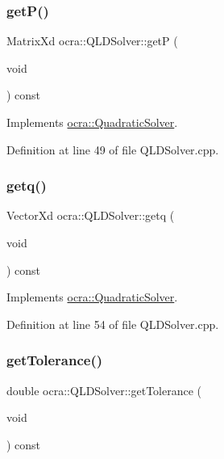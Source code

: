 \subsubsection{\texorpdfstring{get\+P()}{getP()}}
{\footnotesize\ttfamily Matrix\+Xd ocra\+::\+Q\+L\+D\+Solver\+::getP (\begin{DoxyParamCaption}\item[{void}]{ }\end{DoxyParamCaption}) const\hspace{0.3cm}{\ttfamily [virtual]}}



Implements \hyperlink{classocra_1_1QuadraticSolver_a4dcc2768227c21262571d19c0d494935}{ocra\+::\+Quadratic\+Solver}.



Definition at line 49 of file Q\+L\+D\+Solver.\+cpp.

\hypertarget{classocra_1_1QLDSolver_ae824b54386917fbd98c2fa4a3242e06a}{}\label{classocra_1_1QLDSolver_ae824b54386917fbd98c2fa4a3242e06a} 
\subsubsection{\texorpdfstring{getq()}{getq()}}
{\footnotesize\ttfamily Vector\+Xd ocra\+::\+Q\+L\+D\+Solver\+::getq (\begin{DoxyParamCaption}\item[{void}]{ }\end{DoxyParamCaption}) const\hspace{0.3cm}{\ttfamily [virtual]}}



Implements \hyperlink{classocra_1_1QuadraticSolver_a2a907a3fc7c60a7bf9e6a3403c544dcc}{ocra\+::\+Quadratic\+Solver}.



Definition at line 54 of file Q\+L\+D\+Solver.\+cpp.

\hypertarget{classocra_1_1QLDSolver_a491581b625f562d7c5bd8b939a9bafe9}{}\label{classocra_1_1QLDSolver_a491581b625f562d7c5bd8b939a9bafe9} 
\subsubsection{\texorpdfstring{get\+Tolerance()}{getTolerance()}}
{\footnotesize\ttfamily double ocra\+::\+Q\+L\+D\+Solver\+::get\+Tolerance (\begin{DoxyParamCaption}\item[{void}]{ }\end{DoxyParamCaption}) const}



